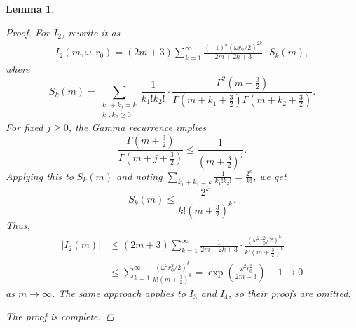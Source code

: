 \documentclass[11pt,reqno,oneside]{amsart}
\numberwithin{equation}{section}
\newtheorem{lemma}[theorem]{Lemma}
\theoremstyle{definition}
\theoremstyle{remark}
\numberwithin{equation}{section}
\begin{document}
\begin{lemma}
\begin{proof}
			For $I_2$, rewrite it as
			\[
			\begin{aligned}
				I_2\left(m, \omega, r_0\right)=(2 m+3) \sum_{k=1}^{\infty} \frac{(-1)^k\left(\omega r_0 / 2\right)^{2 k}}{2 m+2 k+3} \cdot S_k(m),
			\end{aligned}
			\]
			where 
			\[
			S_k(m)=\sum_{\substack{k_1+k_2=k \\ k_1, k_2 \geq 0}} \frac{1}{k_{1}!k_{2}!} \cdot \frac{\Gamma^2\left(m+\frac{3}{2}\right)}{\Gamma\left(m+k_1+\frac{3}{2}\right) \Gamma\left(m+k_2+\frac{3}{2}\right)}.
			\]
			For fixed $j \geq 0$, the Gamma recurrence implies
			\[
			\frac{\Gamma\left(m+\frac{3}{2}\right)}{\Gamma\left(m+j+\frac{3}{2}\right)} \leq \frac{1}{\left(m+\frac{3}{2}\right)^j}.
			\]
			Applying this to $S_k(m)$ and noting $\sum_{k_1+k_2=k} \frac{1}{k_{1}!k_{2}!}=\frac{2^k}{k!}$, we get
			\[
			S_k(m) \leq \frac{2^k}{k!\left(m+\frac{3}{2}\right)^k}.
			\]
			Thus,
			\begin{equation*}
				\begin{aligned}
					\left|I_2(m)\right| &\leq(2 m+3) \sum_{k=1}^{\infty} \frac{1}{2 m+2 k+3} \cdot \frac{\left(\omega^2 r_0^2 / 2\right)^k}{k!\left(m+\frac{3}{2}\right)^k}\\
					&\leqslant \sum_{k=1}^{\infty} \frac{\left(\omega^2 r_0^2 / 2\right)^k}{k!\left(m+\frac{3}{2}\right)^k}=\exp(\frac{\omega^2 r_0^2}{2m+3})-1\rightarrow 0
				\end{aligned}
			\end{equation*}
			as $m \rightarrow \infty$. The same approach applies to $I_3$ and $I_4$, so their proofs are omitted.
			
			The proof is complete.
		\end{proof}
	\end{lemma}
	
\end{document}
